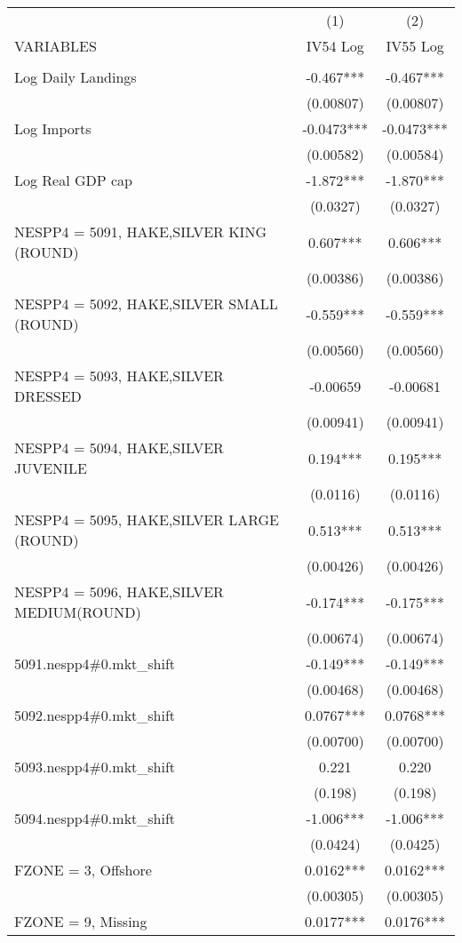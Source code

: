 \begin{tabular}{lcc} \hline
 & (1) & (2) \\
VARIABLES & IV54 Log & IV55 Log \\ \hline
 &  &  \\
Log Daily Landings & -0.467*** & -0.467*** \\
 & (0.00807) & (0.00807) \\
Log Imports & -0.0473*** & -0.0473*** \\
 & (0.00582) & (0.00584) \\
Log Real GDP cap & -1.872*** & -1.870*** \\
 & (0.0327) & (0.0327) \\
NESPP4 = 5091, HAKE,SILVER KING (ROUND) & 0.607*** & 0.606*** \\
 & (0.00386) & (0.00386) \\
NESPP4 = 5092, HAKE,SILVER SMALL (ROUND) & -0.559*** & -0.559*** \\
 & (0.00560) & (0.00560) \\
NESPP4 = 5093, HAKE,SILVER DRESSED & -0.00659 & -0.00681 \\
 & (0.00941) & (0.00941) \\
NESPP4 = 5094, HAKE,SILVER JUVENILE & 0.194*** & 0.195*** \\
 & (0.0116) & (0.0116) \\
NESPP4 = 5095, HAKE,SILVER LARGE (ROUND) & 0.513*** & 0.513*** \\
 & (0.00426) & (0.00426) \\
NESPP4 = 5096, HAKE,SILVER MEDIUM(ROUND) & -0.174*** & -0.175*** \\
 & (0.00674) & (0.00674) \\
5091.nespp4\#0.mkt\_shift & -0.149*** & -0.149*** \\
 & (0.00468) & (0.00468) \\
5092.nespp4\#0.mkt\_shift & 0.0767*** & 0.0768*** \\
 & (0.00700) & (0.00700) \\
5093.nespp4\#0.mkt\_shift & 0.221 & 0.220 \\
 & (0.198) & (0.198) \\
5094.nespp4\#0.mkt\_shift & -1.006*** & -1.006*** \\
 & (0.0424) & (0.0425) \\
FZONE = 3, Offshore & 0.0162*** & 0.0162*** \\
 & (0.00305) & (0.00305) \\
FZONE = 9, Missing & 0.0177*** & 0.0176*** \\

\end{tabular}
